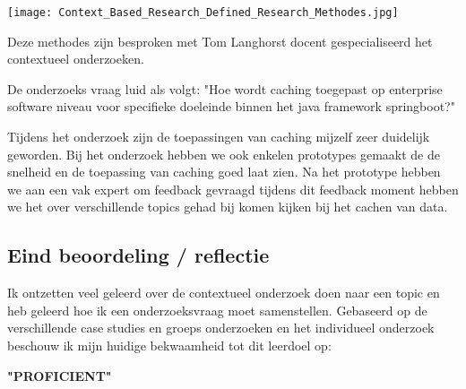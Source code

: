 \texttt{[image: Context\_Based\_Research\_Defined\_Research\_Methodes.jpg]}\label{fig:research_methodes}

Deze methodes zijn besproken met Tom Langhorst docent gespecialiseerd het contextueel onderzoeken.

De onderzoeks vraag luid als volgt: "Hoe wordt caching toegepast op enterprise software niveau voor specifieke doeleinde binnen het java framework springboot?"

Tijdens het onderzoek zijn de toepassingen van caching mijzelf zeer duidelijk geworden.
Bij het onderzoek hebben we ook enkelen prototypes gemaakt de de snelheid en de toepassing van caching goed laat zien.
Na het prototype hebben we aan een vak expert om feedback gevraagd tijdens dit feedback moment hebben we het over verschillende topics gehad bij komen kijken bij het cachen van data.


\subsection{Eind beoordeling / reflectie}
Ik ontzetten veel geleerd over de contextueel onderzoek doen naar een topic en heb geleerd hoe ik een onderzoeksvraag moet samenstellen.
Gebaseerd op de verschillende case studies en groeps onderzoeken en het individueel onderzoek beschouw ik mijn huidige bekwaamheid tot dit leerdoel op:\\
\par\vspace{10pt}\textbf{\uppercase{"Proficient"}}\\


\newpage
